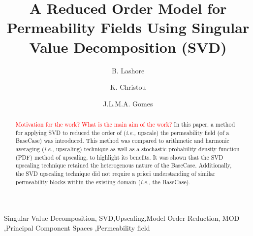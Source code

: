 \documentclass[preprint,12pt]{elsarticle}
\newcommand{\red}{\textcolor{red}}
\newcommand{\ie}{{\it i.e., }}
\begin{document}
\begin{frontmatter}



\title{A Reduced Order Model for Permeability Fields Using Singular Value Decomposition (SVD)}
\author[UoA]{B. Lashore} \author[UoA]{K. Christou} \author[UoA]{J.L.M.A. Gomes} 
\address[UoA]{Mechanics of Fluids, Soils \& Structures Research Group \\ School of Engineering, University of Aberdeen, UK}


\begin{abstract}

\red{Motivation for the work? What is the main aim of the work?} In this paper, a method for applying SVD to reduced the order of (\ie upscale) the permeability field (of a BaseCase) was introduced. This method was compared to arithmetic and harmonic averaging (\ie upscaling) technique as well as a stochastic probability density function (PDF) method of upscaling, to highlight its benefits. It was shown that the SVD upscaling technique retained the heterogenous nature of the BaseCase. Additionally, the SVD upscaling technique did not require a priori understanding of similar permeability blocks within the existing domain (\ie the BaseCase).

\end{abstract}



\begin{keyword} %
Singular Value Decomposition, SVD\sep Upscaling\sep Model Order Reduction, MOD \sep  Principal Component Spaces \sep Permeability field
\end{keyword}
 
\end{frontmatter}
\end{document}
